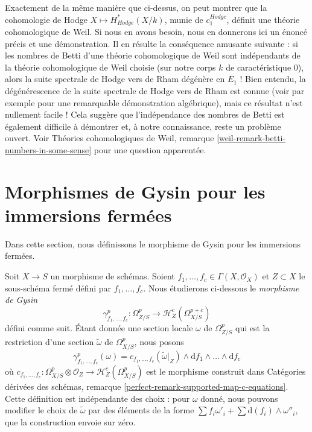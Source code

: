 \begin{remark}
\label{remark-hodge-cohomology-is-weil}
Exactement de la même manière que ci-dessus, on peut montrer que
la cohomologie de Hodge $X \mapsto H_{Hodge}^*(X/k)$, munie
de $c_1^{Hodge}$, définit une théorie
cohomologique de Weil. Si nous en avons besoin, nous en donnerons ici
un énoncé précis et une démonstration. Il en résulte la conséquence
amusante suivante : si les nombres de Betti d'une théorie cohomologique
de Weil sont indépendants de la théorie cohomologique de Weil choisie
(sur notre corps $k$ de caractéristique $0$), alors
la suite spectrale de Hodge vers de Rham
dégénère en $E_1$ ! Bien entendu, la dégénérescence de
la suite spectrale de Hodge vers de Rham est connue
(voir par exemple \cite{Deligne-Illusie} pour une remarquable démonstration algébrique),
mais ce résultat n'est nullement facile ! Cela suggère que l'indépendance
des nombres de Betti est également difficile à démontrer
et, à notre connaissance, reste un problème ouvert. Voir
Théories cohomologiques de Weil, remarque
\ref{weil-remark-betti-numbers-in-some-sense} pour une question apparentée.
\end{remark}







\section{Morphismes de Gysin pour les immersions fermées}
\label{section-gysin}

\noindent
Dans cette section, nous définissons le morphisme de Gysin pour les immersions fermées.

\begin{remark}
\label{remark-gysin-equations}
Soit $X \to S$ un morphisme de schémas. Soient
$f_1, \ldots, f_c \in \Gamma(X, \mathcal{O}_X)$ et $Z \subset X$
le sous-schéma fermé défini par $f_1, \ldots, f_c$. Nous étudierons ci-dessous le {\it morphisme de Gysin}
\begin{equation}
\label{equation-gysin}
\gamma^p_{f_1, \ldots, f_c} :
\Omega^p_{Z/S}
\longrightarrow
\mathcal{H}_Z^c(\Omega^{p + c}_{X/S})
\end{equation}
défini comme suit. Étant donnée une section locale $\omega$ de $\Omega^p_{Z/S}$
qui est la restriction d'une section $\tilde \omega$ de $\Omega^p_{X/S}$,
nous posons
$$
\gamma^p_{f_1, \ldots, f_c}(\omega) =
c_{f_1, \ldots, f_c}(\tilde \omega|_Z) \wedge
\text{d}f_1 \wedge \ldots \wedge \text{d}f_c
$$
où $c_{f_1, \ldots, f_c} : \Omega^p_{X/S} \otimes \mathcal{O}_Z \to
\mathcal{H}_Z^c(\Omega^p_{X/S})$ est le morphisme construit dans
Catégories dérivées des schémas, remarque
\ref{perfect-remark-supported-map-c-equations}.
Cette définition est indépendante des choix : pour $\omega$ donné, nous pouvons modifier le choix de
$\tilde \omega$ par des éléments de la forme
$\sum f_i \omega'_i + \sum \text{d}(f_i) \wedge \omega''_i$,
que la construction envoie sur zéro.
\end{remark}

